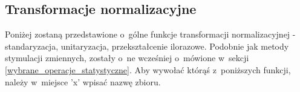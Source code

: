 \documentclass[12pt,a4paper]{report}
\begin{document}
\subsection{Transformacje normalizacyjne}
Poniżej zostaną przedstawione o~gólne funkcje transformacji normalizacyjnej - standaryzacja, unitaryzacja, przekształcenie ilorazowe. Podobnie jak metody stymulacji zmiennych, zostały o~ne wcześniej o~mówione w~sekcji \ref{wybrane_operacje_statystyczne}. Aby wywołać którąś z~poniższych funkcji, należy w~miejsce 'x' wpisać nazwę zbioru.

{
\newcommand{\VerbBar}{|}
\newcommand{\VERB}{\Verb[commandchars=\\\{\}]}

\newenvironment{Shaded}{\begin{snugshade}}{\end{snugshade}}
\newcommand{\KeywordTok}[1]{\textcolor[rgb]{0.13,0.29,0.53}{\textbf{{#1}}}}
\newcommand{\DataTypeTok}[1]{\textcolor[rgb]{0.13,0.29,0.53}{{#1}}}
\newcommand{\DecValTok}[1]{\textcolor[rgb]{0.00,0.00,0.81}{{#1}}}
\newcommand{\BaseNTok}[1]{\textcolor[rgb]{0.00,0.00,0.81}{{#1}}}
\newcommand{\FloatTok}[1]{\textcolor[rgb]{0.00,0.00,0.81}{{#1}}}
\newcommand{\ConstantTok}[1]{\textcolor[rgb]{0.00,0.00,0.00}{{#1}}}
\newcommand{\CharTok}[1]{\textcolor[rgb]{0.31,0.60,0.02}{{#1}}}
\newcommand{\SpecialCharTok}[1]{\textcolor[rgb]{0.00,0.00,0.00}{{#1}}}
\newcommand{\StringTok}[1]{\textcolor[rgb]{0.31,0.60,0.02}{{#1}}}
\newcommand{\VerbatimStringTok}[1]{\textcolor[rgb]{0.31,0.60,0.02}{{#1}}}
\newcommand{\SpecialStringTok}[1]{\textcolor[rgb]{0.31,0.60,0.02}{{#1}}}
\newcommand{\ImportTok}[1]{{#1}}
\newcommand{\CommentTok}[1]{\textcolor[rgb]{0.56,0.35,0.01}{\textit{{#1}}}}
\newcommand{\DocumentationTok}[1]{\textcolor[rgb]{0.56,0.35,0.01}{\textbf{\textit{{#1}}}}}
\newcommand{\AnnotationTok}[1]{\textcolor[rgb]{0.56,0.35,0.01}{\textbf{\textit{{#1}}}}}
\newcommand{\CommentVarTok}[1]{\textcolor[rgb]{0.56,0.35,0.01}{\textbf{\textit{{#1}}}}}
\newcommand{\OtherTok}[1]{\textcolor[rgb]{0.56,0.35,0.01}{{#1}}}
\newcommand{\FunctionTok}[1]{\textcolor[rgb]{0.00,0.00,0.00}{{#1}}}
\newcommand{\VariableTok}[1]{\textcolor[rgb]{0.00,0.00,0.00}{{#1}}}
\newcommand{\ControlFlowTok}[1]{\textcolor[rgb]{0.13,0.29,0.53}{\textbf{{#1}}}}
\newcommand{\OperatorTok}[1]{\textcolor[rgb]{0.81,0.36,0.00}{\textbf{{#1}}}}
\newcommand{\BuiltInTok}[1]{{#1}}
\newcommand{\ExtensionTok}[1]{{#1}}
\newcommand{\PreprocessorTok}[1]{\textcolor[rgb]{0.56,0.35,0.01}{\textit{{#1}}}}
\newcommand{\AttributeTok}[1]{\textcolor[rgb]{0.77,0.63,0.00}{{#1}}}
\newcommand{\RegionMarkerTok}[1]{{#1}}
\newcommand{\InformationTok}[1]{\textcolor[rgb]{0.56,0.35,0.01}{\textbf{\textit{{#1}}}}}
\newcommand{\WarningTok}[1]{\textcolor[rgb]{0.56,0.35,0.01}{\textbf{\textit{{#1}}}}}
\newcommand{\AlertTok}[1]{\textcolor[rgb]{0.94,0.16,0.16}{{#1}}}
\newcommand{\ErrorTok}[1]{\textcolor[rgb]{0.64,0.00,0.00}{\textbf{{#1}}}}
\newcommand{\NormalTok}[1]{{#1}}



}
\end{document}
